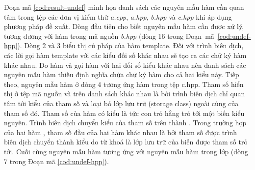 Đoạn mã \autoref{cod:result-undef} minh họa danh sách các nguyên mẫu hàm cần quan tâm trong tệp các đơn vị kiểm thử \textit{a.cpp}, \textit{a.hpp}, \textit{b.hpp} và \textit{c.hpp} khi áp dụng phương pháp đề xuất. Dòng đầu tiên cho biết nguyên mẫu hàm  cần được xử lý, tương đương với hàm  trong mã nguồn \textit{b.hpp} (dòng 16 trong Đoạn~mã~\autoref{cod:undef-hpp}). Dòng 2 và 3 biểu thị cú pháp của hàm template. Đối với trình biên dịch, các lời gọi hàm template với các kiểu đối số khác nhau sẽ tạo ra các chữ ký hàm khác nhau. Do hàm  và  gọi hàm  với hai đối số kiểu khác nhau nên danh sách các nguyên mẫu hàm thiếu định nghĩa chứa chữ ký hàm cho cả hai kiểu này. Tiếp theo, nguyên mẫu hàm ở dòng 4 tương ứng hàm  trong tệp c.hpp. Tham số hiển thị ở tệp mã nguồn và trên danh sách khác nhau là bởi trình biên dịch chỉ quan tâm tới kiểu của tham số và loại bỏ lớp lưu trữ (storage class) ngoài cùng của tham số đó. Tham số  của hàm  có kiểu là  tức con trỏ hằng trỏ tới một biến kiểu nguyên. Trình biên dịch chuyển kiểu của tham số trên thành . Trong trường hợp của hai hàm , tham số đầu của hai hàm khác nhau là bởi tham số  được trình biên dịch chuyển thành kiểu  do từ khoá  là lớp lưu trữ của biến được tham số trỏ tới. Cuối cùng nguyên mẫu hàm  tương ứng với nguyên mẫu hàm  trong lớp  (dòng 7 trong Đoạn mã \autoref{cod:undef-hpp}).

